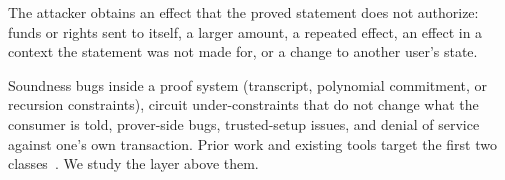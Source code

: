 The attacker obtains an effect that the proved statement does not authorize:
funds or rights sent to itself, a larger amount, a repeated effect, an effect
in a context the statement was not made for, or a change to another user's
state.

Soundness bugs inside a proof system (transcript, polynomial commitment, or
recursion constraints), circuit under-constraints that do not change what the
consumer is told, prover-side bugs, trusted-setup issues, and denial of
service against one's own transaction. Prior work and existing tools target
the first two classes~\cite{sok-snark-bugs,picus,circomspect}. We study the
layer above them.
